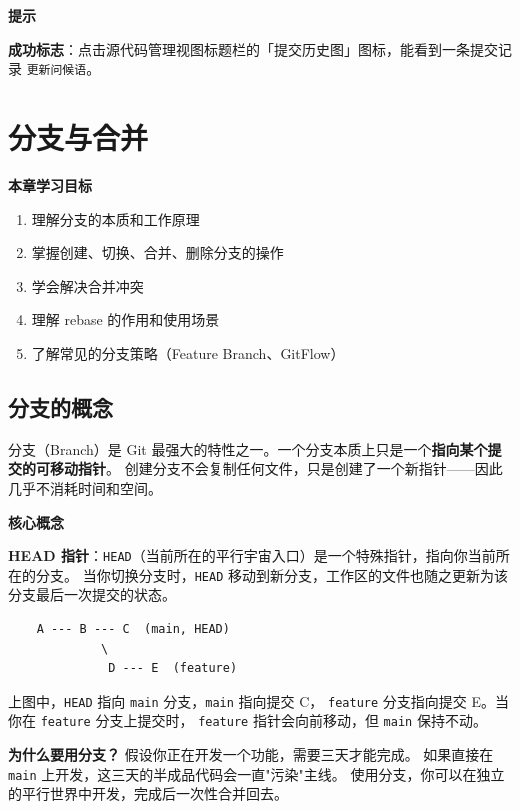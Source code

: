 \documentclass[12pt,a4paper,openany]{ctexbook}
\newenvironment{tipbox}{%
  \medskip
  \noindent\textbf{\faLightbulb\; 提示}
  \smallskip
}{%
  \medskip
}
\newenvironment{keybox}{%
  \medskip
  \noindent\textbf{\faKey\; 核心概念}
  \smallskip
}{%
  \medskip
}
\begin{document}
\begin{tipbox}
\textbf{成功标志}：点击源代码管理视图标题栏的「提交历史图」图标，能看到一条提交记录 \texttt{更新问候语}。
\end{tipbox}

\chapter{分支与合并}

\begin{infobox}
\textbf{本章学习目标}
\begin{enumerate}[leftmargin=1.5em]
  \item 理解分支的本质和工作原理
  \item 掌握创建、切换、合并、删除分支的操作
  \item 学会解决合并冲突
  \item 理解 rebase 的作用和使用场景
  \item 了解常见的分支策略（Feature Branch、GitFlow）
\end{enumerate}
\end{infobox}

\section{分支的概念}

分支（Branch）是 Git 最强大的特性之一。一个分支本质上只是一个\textbf{指向某个提交的可移动指针}。
创建分支不会复制任何文件，只是创建了一个新指针——因此几乎不消耗时间和空间。

\begin{keybox}
\textbf{HEAD 指针}：\texttt{HEAD}（当前所在的平行宇宙入口）是一个特殊指针，指向你当前所在的分支。
当你切换分支时，\texttt{HEAD} 移动到新分支，工作区的文件也随之更新为该分支最后一次提交的状态。

\begin{verbatim}
    A --- B --- C  (main, HEAD)
             \
              D --- E  (feature)
\end{verbatim}

上图中，\texttt{HEAD} 指向 \texttt{main} 分支，\texttt{main} 指向提交 C，
\texttt{feature} 分支指向提交 E。当你在 \texttt{feature} 分支上提交时，
\texttt{feature} 指针会向前移动，但 \texttt{main} 保持不动。
\end{keybox}

\textbf{为什么要用分支？} 假设你正在开发一个功能，需要三天才能完成。
如果直接在 \texttt{main} 上开发，这三天的半成品代码会一直"污染"主线。
使用分支，你可以在独立的平行世界中开发，完成后一次性合并回去。
\end{document}
